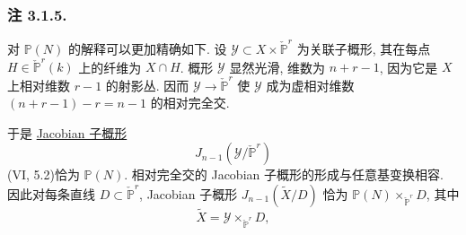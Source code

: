 \subsubsection*{注 3.1.5.}
对 $\mathbb P(N)$ 的解释可以更加精确如下. 设 $\mathcal Y\subset X\times\check{\mathbb P}^{r}$ 为关联子概形, 其在每点 $H\in\check{\mathbb P}^{r}(k)$ 上的纤维为 $X\cap H$. 概形 $\mathcal Y$ 显然光滑, 维数为 $n+r-1$, 因为它是 $X$ 上相对维数 $r-1$ 的射影丛. 因而 $\mathcal Y\to\check{\mathbb P}^{r}$ 使 $\mathcal Y$ 成为虚相对维数 $(n+r-1)-r=n-1$ 的相对完全交.

于是 \underline{Jacobian 子概形}
\[
J_{n-1}(\mathcal Y/\check{\mathbb P}^{r})
\]
(VI, 5.2)恰为 $\mathbb P(N)$. 相对完全交的 Jacobian 子概形的形成与任意基变换相容. 因此对每条直线 $D\subset\check{\mathbb P}^{r}$, Jacobian 子概形 $J_{n-1}(\widetilde X/D)$ 恰为 $\mathbb P(N)\times_{\check{\mathbb P}^{r}}D$, 其中
\[
\widetilde X=\mathcal Y\times_{\check{\mathbb P}^{r}}D,
\]